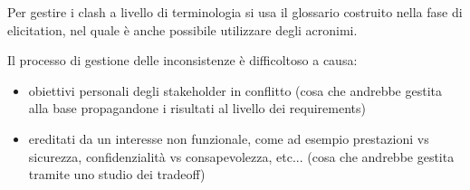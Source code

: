 Per gestire i clash a livello di terminologia si usa il glossario costruito nella
fase di elicitation, nel quale è anche possibile utilizzare degli acronimi.

Il processo di gestione delle inconsistenze è difficoltoso a causa:
\begin{itemize}
      \item obiettivi personali degli stakeholder in conflitto (cosa che 
            andrebbe gestita alla base propagandone i risultati al livello dei requirements)
      \item ereditati da un interesse non funzionale, come ad esempio prestazioni vs
            sicurezza, confidenzialità vs consapevolezza, etc... (cosa che andrebbe
            gestita tramite uno studio dei tradeoff)
\end{itemize}

